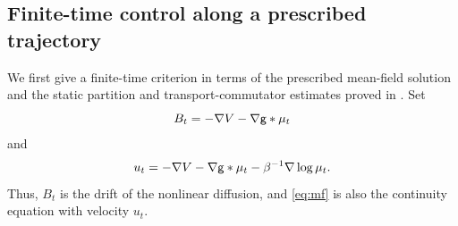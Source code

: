 \documentclass[11pt,reqno]{amsart}
\numberwithin{equation}{section}
\theoremstyle{plain}
\theoremstyle{remark}
\begin{document}
\subsection{Finite-time control along a prescribed trajectory}

{We first give a finite-time criterion in terms of the prescribed mean-field solution and the static partition and transport-commutator estimates proved in \cite{DGRpartition}.} Set
\begin{equation}\label{eq:finite-drift}
 B_t=-\nabla V-\nabla\mathsf g*\mu_t
\end{equation}
and
\begin{equation}\label{eq:velocity}
 u_t=-\nabla V-\nabla\mathsf g*\mu_t-\beta^{-1}\nabla\log\mu_t.
\end{equation}
Thus, $B_t$ is the drift of the nonlinear diffusion, and \eqref{eq:mf} is also the continuity equation with velocity $u_t$.
\end{document}
